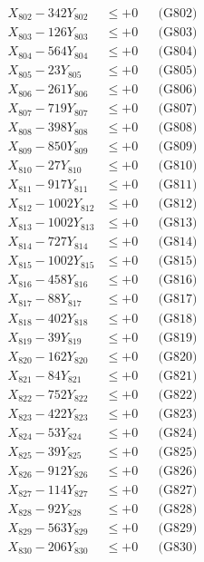 \documentclass[a4paper,10pt]{article}
\begin{document}
{\begin{align}
X_{802} - 342Y_{802} &\leq +0 && \text{(G802)} \\
X_{803} - 126Y_{803} &\leq +0 && \text{(G803)} \\
X_{804} - 564Y_{804} &\leq +0 && \text{(G804)} \\
X_{805} - 23Y_{805} &\leq +0 && \text{(G805)} \\
X_{806} - 261Y_{806} &\leq +0 && \text{(G806)} \\
X_{807} - 719Y_{807} &\leq +0 && \text{(G807)} \\
X_{808} - 398Y_{808} &\leq +0 && \text{(G808)} \\
X_{809} - 850Y_{809} &\leq +0 && \text{(G809)} \\
X_{810} - 27Y_{810} &\leq +0 && \text{(G810)} \\
\allowbreak
X_{811} - 917Y_{811} &\leq +0 && \text{(G811)} \\
X_{812} - 1002Y_{812} &\leq +0 && \text{(G812)} \\
X_{813} - 1002Y_{813} &\leq +0 && \text{(G813)} \\
X_{814} - 727Y_{814} &\leq +0 && \text{(G814)} \\
X_{815} - 1002Y_{815} &\leq +0 && \text{(G815)} \\
X_{816} - 458Y_{816} &\leq +0 && \text{(G816)} \\
X_{817} - 88Y_{817} &\leq +0 && \text{(G817)} \\
X_{818} - 402Y_{818} &\leq +0 && \text{(G818)} \\
X_{819} - 39Y_{819} &\leq +0 && \text{(G819)} \\
X_{820} - 162Y_{820} &\leq +0 && \text{(G820)} \\
\allowbreak
X_{821} - 84Y_{821} &\leq +0 && \text{(G821)} \\
X_{822} - 752Y_{822} &\leq +0 && \text{(G822)} \\
X_{823} - 422Y_{823} &\leq +0 && \text{(G823)} \\
X_{824} - 53Y_{824} &\leq +0 && \text{(G824)} \\
X_{825} - 39Y_{825} &\leq +0 && \text{(G825)} \\
X_{826} - 912Y_{826} &\leq +0 && \text{(G826)} \\
X_{827} - 114Y_{827} &\leq +0 && \text{(G827)} \\
X_{828} - 92Y_{828} &\leq +0 && \text{(G828)} \\
X_{829} - 563Y_{829} &\leq +0 && \text{(G829)} \\
X_{830} - 206Y_{830} &\leq +0 && \text{(G830)} \\

\end{align}}
\end{document}
